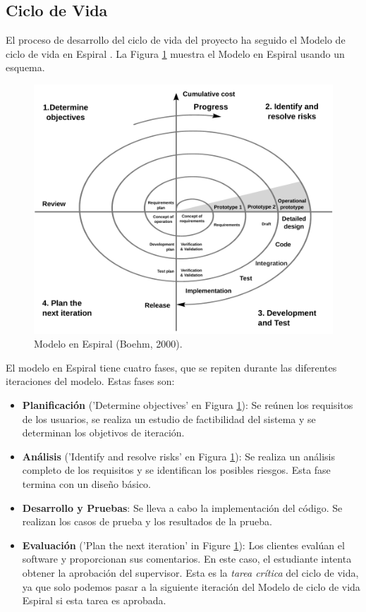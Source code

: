 \subsection{Ciclo de Vida}

El proceso de desarrollo del ciclo de vida del proyecto ha seguido el Modelo de ciclo de vida en Espiral \cite{boehm1988}. La Figura \ref{fig:spiral_model} muestra el Modelo en Espiral usando un esquema.

\begin{figure}[htbp]
 	\centering
 	\includegraphics[width=12cm]{figures/spiral_model}
 	\caption{Modelo en Espiral (Boehm, 2000).}
	\label{fig:spiral_model}
\end{figure}

El modelo en Espiral tiene cuatro fases, que se repiten durante las diferentes iteraciones del modelo. Estas fases son:

\begin{itemize}
\item \textbf{Planificación} ('Determine objectives' en Figura \ref{fig:spiral_model}): Se reúnen los requisitos de los usuarios, se realiza un estudio de factibilidad del sistema y se determinan los objetivos de iteración.

\item \textbf{Análisis} ('Identify and resolve risks' en Figura \ref{fig:spiral_model}): Se realiza un análisis completo de los requisitos y se identifican los posibles riesgos. Esta fase termina con un diseño básico.

\item \textbf{Desarrollo y Pruebas}: Se lleva a cabo la implementación del código. Se realizan los casos de prueba y los resultados de la prueba.

\item \textbf{Evaluación} ('Plan the next iteration' in Figure \ref{fig:spiral_model}): 
Los clientes evalúan el software y proporcionan sus comentarios. En este caso, el estudiante intenta obtener la aprobación del supervisor. Esta es la \textit{tarea crítica} del ciclo de vida, ya que solo podemos pasar a la siguiente iteración del Modelo de ciclo de vida Espiral si esta tarea es aprobada.

\end{itemize}

